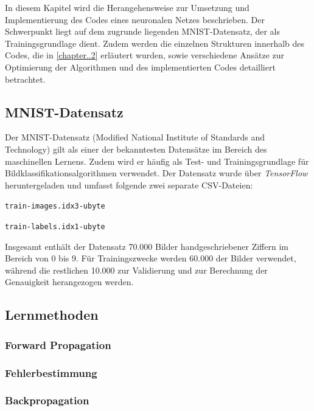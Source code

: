 \documentclass[a4paper, 12pt]{article}
\begin{document}
In diesem Kapitel wird die Herangehensweise zur Umsetzung und Implementierung des Codes eines 
neuronalen Netzes beschrieben. Der Schwerpunkt liegt auf dem zugrunde liegenden MNIST-Datensatz, 
der als Trainingsgrundlage dient. Zudem werden die einzelnen Strukturen innerhalb des Codes, die 
in \autoref{chapter..2} erläutert wurden, sowie verschiedene Ansätze zur Optimierung der 
Algorithmen und des implementierten Codes detailliert betrachtet.

\subsection{MNIST-Datensatz}\label{chapter..3.1}

Der MNIST-Datensatz (Modified National Institute of Standards and Technology) gilt als einer der 
bekanntesten Datensätze im Bereich des maschinellen Lernens. Zudem wird er häufig als Test- und 
Trainingsgrundlage für Bildklassifikationsalgorithmen verwendet. Der Datensatz wurde über 
\textit{TensorFlow} heruntergeladen und umfasst folgende zwei separate CSV-Dateien:

\begin{center}
	\texttt{train-images.idx3-ubyte}
\end{center}

\begin{center}
	\texttt{train-labels.idx1-ubyte}
\end{center}

Insgesamt enthält der Datensatz 70.000 Bilder handgeschriebener Ziffern im Bereich von 0 bis 9. 
Für Trainingszwecke werden 60.000 der Bilder verwendet, während die restlichen 10.000 zur 
Validierung und zur Berechnung der Genauigkeit herangezogen werden.

\subsection{Lernmethoden} 
\subsubsection{Forward Propagation} 
\subsubsection{Fehlerbestimmung} 
\subsubsection{Backpropagation}
\end{document}
